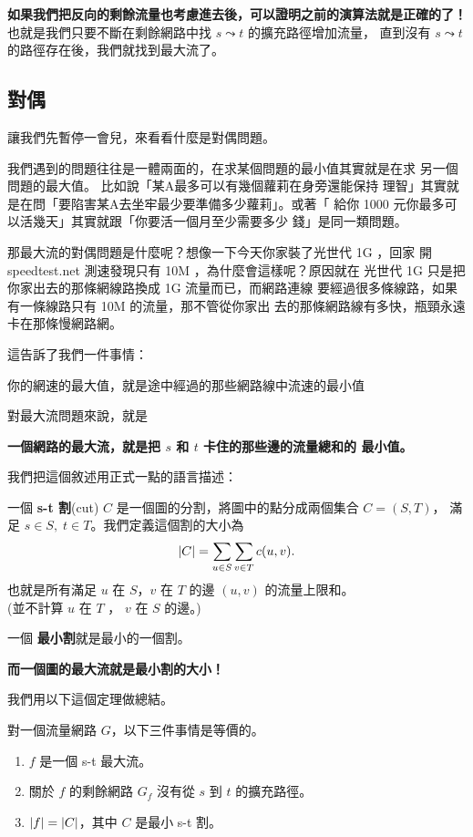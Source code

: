 \documentclass[a4paper,12pt]{book}
\begin{document}
{\bf 如果我們把反向的剩餘流量也考慮進去後，可以證明之前的演算法就是正確的了！}
也就是我們只要不斷在剩餘網路中找 $s \leadsto t$ 的擴充路徑增加流量，
直到沒有 $s \leadsto t$ 的路徑存在後，我們就找到最大流了。

\subsection{對偶}
讓我們先暫停一會兒，來看看什麼是對偶問題。

我們遇到的問題往往是一體兩面的，在求某個問題的最小值其實就是在求
另一個問題的最大值。 比如說「某A最多可以有幾個蘿莉在身旁還能保持
理智」其實就是在問「要陷害某A去坐牢最少要準備多少蘿莉」。或著「
給你 1000 元你最多可以活幾天」其實就跟「你要活一個月至少需要多少
錢」是同一類問題。

那最大流的對偶問題是什麼呢？想像一下今天你家裝了光世代 1G ，回家
開 speedtest.net 測速發現只有 10M ，為什麼會這樣呢？原因就在
光世代 1G 只是把你家出去的那條網線路換成 1G 流量而已，而網路連線
要經過很多條線路，如果有一條線路只有 10M 的流量，那不管從你家出
去的那條網路線有多快，瓶頸永遠卡在那條慢網路網。

這告訴了我們一件事情：
\begin{displayquote}
  你的網速的最大值，就是途中經過的那些網路線中流速的最小值
\end{displayquote}
對最大流問題來說，就是
\begin{displayquote}
  {\bf 一個網路的最大流，就是把 $s$ 和 $t$ 卡住的那些邊的流量總和的
  最小值。}
\end{displayquote}
我們把這個敘述用正式一點的語言描述：
\begin{theorem}[定義]
  一個 {\bf s-t 割}(cut) $C$ 是一個圖的分割，將圖中的點分成兩個集合 $C = (S, T)$，
  滿足 $s \in S, \; t \in T$。我們定義這個割的大小為
  \[ \lvert C \rvert = \sum_{u \in S} \sum_{v \in T} c(u, v). \]
  也就是所有滿足 $u$ 在 $S$，$v$ 在 $T$ 的邊 $(u, v)$ 的流量上限和。\\
  (並不計算 $u$ 在 $T$ ， $v$ 在 $S$ 的邊。)

  一個 {\bf 最小割}就是最小的一個割。
\end{theorem}
{\bf 而一個圖的最大流就是最小割的大小！}
\begin{figure}[H]
  \centering
  
\end{figure}

我們用以下這個定理做總結。

\begin{theorem}
  對一個流量網路 $G$，以下三件事情是等價的。
  \begin{enumerate}
    \item $f$ 是一個 s-t 最大流。
    \item 關於 $f$ 的剩餘網路 $G_f$ 沒有從 $s$ 到 $t$ 的擴充路徑。
    \item $\lvert f \rvert = \lvert C \rvert$，其中 $C$ 是最小 s-t 割。
  \end{enumerate}
\end{theorem}
\end{document}
